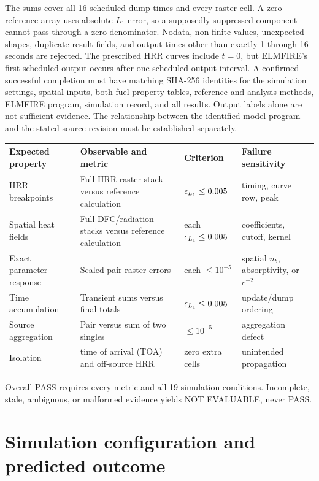 The sums cover all 16 scheduled dump times and every raster cell.  A zero-reference
array uses absolute $L_1$ error, so a supposedly suppressed component cannot
pass through a zero denominator.  Nodata, non-finite values, unexpected
shapes, duplicate result fields, and output times other than exactly 1 through
16 seconds are rejected.  The prescribed HRR curves include $t=0$, but
ELMFIRE's first scheduled output occurs after one scheduled output interval.
A confirmed successful completion must have matching SHA-256 identities for
the simulation settings, spatial inputs, both fuel-property tables, reference
and analysis methods, ELMFIRE program, simulation record, and all results.
Output labels alone are not sufficient evidence. The relationship between the
identified model program and the stated source revision must be established
separately.

\begin{center}

\begin{longtable}{@{}P{0.22\textwidth}P{0.30\textwidth} P{0.17\textwidth}P{0.17\textwidth}@{}}
\toprule
Expected property & Observable and metric & Criterion & Failure sensitivity\\
\midrule
HRR breakpoints & Full HRR raster stack versus reference calculation & $\epsilon_{L_1}\le0.005$ & timing, curve row, peak\\
Spatial heat fields & Full DFC/radiation stacks versus reference calculation & each $\epsilon_{L_1}\le0.005$ & coefficients, cutoff, kernel\\
Exact parameter response & Scaled-pair raster errors & each $\le10^{-5}$ & spatial $n_b$, absorptivity, or $c^{-2}$\\
Time accumulation & Transient sums versus final totals & $\epsilon_{L_1}\le0.005$ & update/dump ordering\\
Source aggregation & Pair versus sum of two singles & $\le10^{-5}$ & aggregation defect\\
Isolation & time of arrival (TOA) and off-source HRR & zero extra cells & unintended propagation\\
\bottomrule
\end{longtable}
\end{center}

Overall PASS requires every metric and all 19 simulation conditions.  Incomplete, stale,
ambiguous, or malformed evidence yields NOT EVALUABLE, never PASS.

\section{Simulation configuration and predicted outcome}

